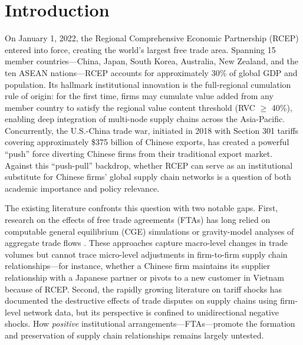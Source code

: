 \documentclass[preprint,12pt,authoryear]{elsarticle}
\begin{document}
\section{Introduction}

On January 1, 2022, the Regional Comprehensive Economic Partnership (RCEP) entered into force, creating the world's largest free trade area. Spanning 15 member countries—China, Japan, South Korea, Australia, New Zealand, and the ten ASEAN nations—RCEP accounts for approximately 30\% of global GDP and population. Its hallmark institutional innovation is the full-regional cumulation rule of origin: for the first time, firms may cumulate value added from any member country to satisfy the regional value content threshold (RVC $\geq$ 40\%), enabling deep integration of multi-node supply chains across the Asia-Pacific. Concurrently, the U.S.-China trade war, initiated in 2018 with Section 301 tariffs covering approximately \$375 billion of Chinese exports, has created a powerful ``push'' force diverting Chinese firms from their traditional export market. Against this ``push-pull'' backdrop, whether RCEP can serve as an institutional substitute for Chinese firms' global supply chain networks is a question of both academic importance and policy relevance.

The existing literature confronts this question with two notable gaps. First, research on the effects of free trade agreements (FTAs) has long relied on computable general equilibrium (CGE) simulations or gravity-model analyses of aggregate trade flows \cite{petri2020,baier2007}. These approaches capture macro-level changes in trade volumes but cannot trace micro-level adjustments in firm-to-firm supply chain relationships—for instance, whether a Chinese firm maintains its supplier relationship with a Japanese partner or pivots to a new customer in Vietnam because of RCEP. Second, the rapidly growing literature on tariff shocks \cite{ding2024,difan2022,alfaro2023,crosignani2022} has documented the destructive effects of trade disputes on supply chains using firm-level network data, but its perspective is confined to unidirectional negative shocks. How \textit{positive} institutional arrangements—FTAs—promote the formation and preservation of supply chain relationships remains largely untested.
\end{document}
